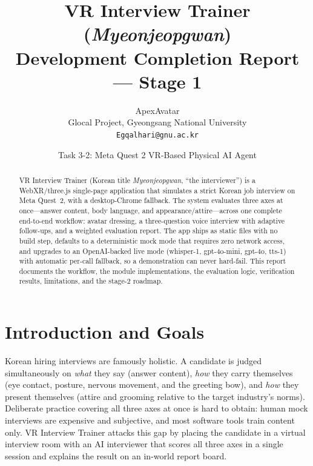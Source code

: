 \documentclass[10pt,a4paper]{article}
\title{VR Interview Trainer (\emph{Myeonjeopgwan})\\Development Completion Report --- Stage 1}
\author{ApexAvatar\\Glocal Project, Gyeongsang National University\\\texttt{Egqalhari@gnu.ac.kr}}
\date{Task 3-2: Meta Quest 2 VR-Based Physical AI Agent}
\begin{document}
\maketitle

\begin{abstract}
\noindent VR Interview Trainer (Korean title \emph{Myeonjeopgwan}, ``the interviewer'') is a WebXR/three.js single-page application that simulates a strict Korean job interview on Meta Quest~2, with a desktop-Chrome fallback. The system evaluates three axes at once---answer content, body language, and appearance/attire---across one complete end-to-end workflow: avatar dressing, a three-question voice interview with adaptive follow-ups, and a weighted evaluation report. The app ships as static files with no build step, defaults to a deterministic mock mode that requires zero network access, and upgrades to an OpenAI-backed live mode (whisper-1, gpt-4o-mini, gpt-4o, tts-1) with automatic per-call fallback, so a demonstration can never hard-fail. This report documents the workflow, the module implementations, the evaluation logic, verification results, limitations, and the stage-2 roadmap.
\end{abstract}

\section{Introduction and Goals}
Korean hiring interviews are famously holistic. A candidate is judged simultaneously on \emph{what} they say (answer content), \emph{how} they carry themselves (eye contact, posture, nervous movement, and the greeting bow), and \emph{how} they present themselves (attire and grooming relative to the target industry's norms). Deliberate practice covering all three axes at once is hard to obtain: human mock interviews are expensive and subjective, and most software tools train content only. VR Interview Trainer attacks this gap by placing the candidate in a virtual interview room with an AI interviewer that scores all three axes in a single session and explains the result on an in-world report board.
\end{document}
